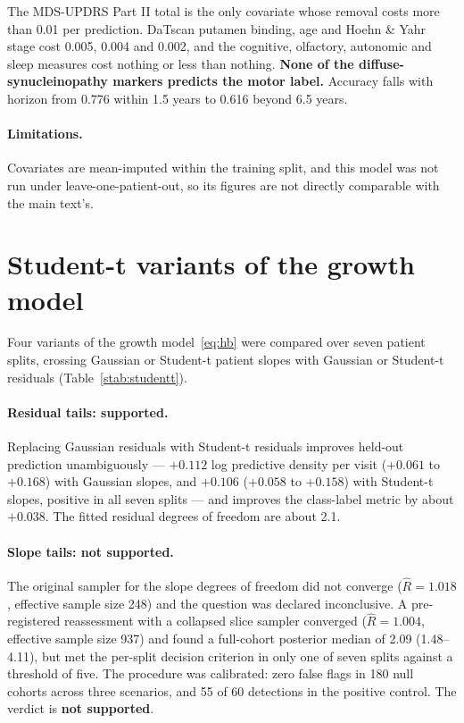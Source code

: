 The MDS-UPDRS Part II total is the only covariate whose removal costs more than
0.01 per prediction. DaTscan putamen binding, age and Hoehn \& Yahr stage cost
0.005, 0.004 and 0.002, and the cognitive, olfactory, autonomic and sleep
measures cost nothing or less than nothing. \textbf{None of the
diffuse-synucleinopathy markers predicts the motor label.} Accuracy falls with
horizon from 0.776 within 1.5 years to 0.616 beyond 6.5 years.

\begin{table}[htbp]
\centering
\caption{First-visit prediction with no longitudinal history.}
\label{stab:firstvisit}
\small

\end{table}

\paragraph{Limitations.} Covariates are mean-imputed within the training split,
and this model was not run under leave-one-patient-out, so its figures are not
directly comparable with the main text's.

\section{Student-t variants of the growth model}
\label{sup:studentt}

Four variants of the growth model~\eqref{eq:hb} were compared over seven patient
splits, crossing Gaussian or Student-t patient slopes with Gaussian or Student-t
residuals (Table~\ref{stab:studentt}).

\paragraph{Residual tails: supported.} Replacing Gaussian residuals with Student-t
residuals improves held-out prediction unambiguously --- $+0.112$ log predictive
density per visit ($+0.061$ to $+0.168$) with Gaussian slopes, and $+0.106$
($+0.058$ to $+0.158$) with Student-t slopes, positive in all seven splits --- and
improves the class-label metric by about $+0.038$. The fitted residual degrees of
freedom are about 2.1.

\paragraph{Slope tails: not supported.} The original sampler for the slope degrees
of freedom did not converge ($\hat{R} = 1.018$, effective sample size 248) and the
question was declared inconclusive. A pre-registered reassessment with a collapsed
slice sampler converged ($\hat{R} = 1.004$, effective sample size 937) and found a
full-cohort posterior median of 2.09 (1.48--4.11), but met the per-split decision
criterion in only one of seven splits against a threshold of five. The procedure
was calibrated: zero false flags in 180 null cohorts across three scenarios, and
55 of 60 detections in the positive control. The verdict is \textbf{not
supported}.

